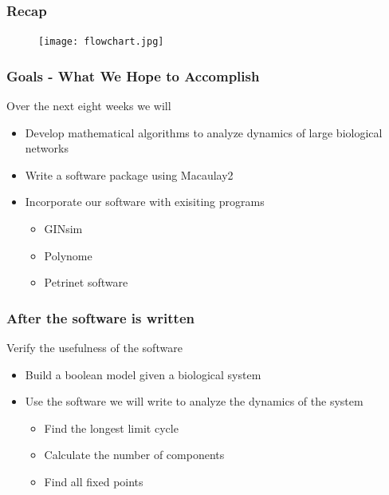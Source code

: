 \documentclass{beamer}
\begin{document}
\begin{frame}
	\frametitle{Recap}
	\begin{figure}
 		\centering
		\texttt{[image: flowchart.jpg]}
	\end{figure}
\end{frame}

\begin{frame}
 \frametitle{Goals - What We Hope to Accomplish}

	Over the next eight weeks we will\\
	\begin{itemize}
	
		\item{Develop mathematical algorithms to analyze dynamics of large biological networks}
		\item{Write a software package using Macaulay2}
		\item{Incorporate our software with exisiting programs}
			\begin{itemize}
				\item{GINsim}
				\item{Polynome}
				\item{Petrinet software}
			\end{itemize}
	\end{itemize}

\end{frame}

\begin{frame}
\frametitle{After the software is written}

	Verify the usefulness of the software\\
		\begin{itemize}
			\item{Build a boolean model given a biological system}
			\item{Use the software we will write to analyze the dynamics of the system}
				\begin{itemize}
			\item{Find the longest limit cycle}
			\item{Calculate the number of components}
			\item{Find all fixed points}
				\end{itemize}
		\end{itemize}

\end{frame}
\end{document}
